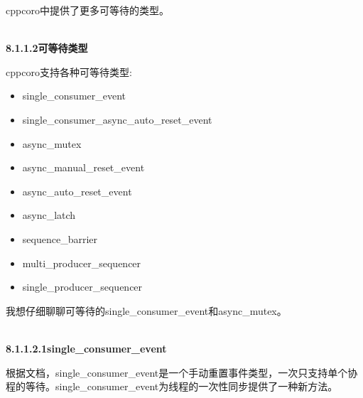 cppcoro中提供了更多可等待的类型。

\hspace*{\fill} \\ %
\noindent
\textbf{8.1.1.2\hspace{0.2cm}可等待类型}

cppcoro支持各种可等待类型:

\begin{itemize}
\item 
single\_consumer\_event

\item 
single\_consumer\_async\_auto\_reset\_event

\item 
async\_mutex

\item 
async\_manual\_reset\_event

\item 
async\_auto\_reset\_event

\item 
async\_latch

\item 
sequence\_barrier

\item 
multi\_producer\_sequencer

\item 
single\_producer\_sequencer
\end{itemize}

我想仔细聊聊可等待的single\_consumer\_event和async\_mutex。

\hspace*{\fill} \\ %
\noindent
\textbf{8.1.1.2.1\hspace{0.2cm}single\_consumer\_event}

根据文档，single\_consumer\_event是一个手动重置事件类型，一次只支持单个协程的等待。single\_consumer\_event为线程的一次性同步提供了一种新方法。

